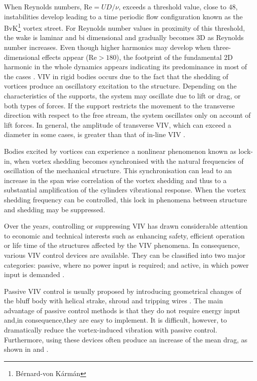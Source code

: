 \documentclass[review]{elsarticle}
\begin{document}
When Reynolds numbers, $\text{Re}=UD/\nu$, exceeds a threshold value, close to $48$, instabilities develop leading to a time periodic flow configuration known as the BvK\footnote{B\'{e}rnard-von K\'{a}rm\'{a}n} vortex street. For Reynolds number values in proximity of this threshold, the wake is laminar and bi dimensional and gradually becomes 3D as Reynolds number increases. Even though higher harmonics may develop when three-dimensional effects appear ($\text{Re}>180$), the footprint of the fundamental 2D harmonic in the whole dynamics appears indicating its predominance in most of the cases \citep{Dusek1994}. VIV in rigid bodies occurs due to the fact that the shedding of vortices produce an oscillatory excitation to the structure. Depending on the characteristics of the supports, the system may oscillate due to lift or drag, or both types of forces. If the support restricts the movement to the transverse direction with respect to the free stream, the system oscillates only on account of lift forces. In general, the amplitude of transverse VIV, which can exceed a diameter in some cases, is greater than that of in-line VIV \citep{Jauvtis2004}. 

Bodies excited by vortices can experience a nonlinear phenomenon known as lock-in, when vortex shedding becomes synchronised with the natural frequencies of oscillation of the mechanical structure. This synchronisation can lead to an increase in the span wise correlation of the vortex shedding and thus to a substantial amplification of the cylinders vibrational response. When the vortex shedding frequency can be controlled, this lock in phenomena between structure and shedding may be suppressed.

Over the years, controlling or suppressing VIV has drawn considerable attention to economic and technical interests such as enhancing safety, efficient operation or life time of the structures affected by the VIV phenomena. In consequence, various VIV control devices are available. They can be classified into two major categories: passive, where no power input is required; and active, in which power input is demanded \citep{Benard2010}.

Passive VIV control is usually proposed by introducing geometrical changes of the bluff body with helical strake, shroud and tripping wires \citep{Hover2001, Bearman2004, Trim2005, Brankovic2006, Korkischko2010}. The main advantage of passive control methods is that they do not require energy input and,in consequence,they are easy to implement. It is difficult, however, to dramatically reduce the vortex-induced vibration with passive control. Furthermore,  using these devices  often produce  an increase of the mean drag, as shown in \cite{Korkischko2010} and \cite{Zdravkovich1981}. 
\end{document}
